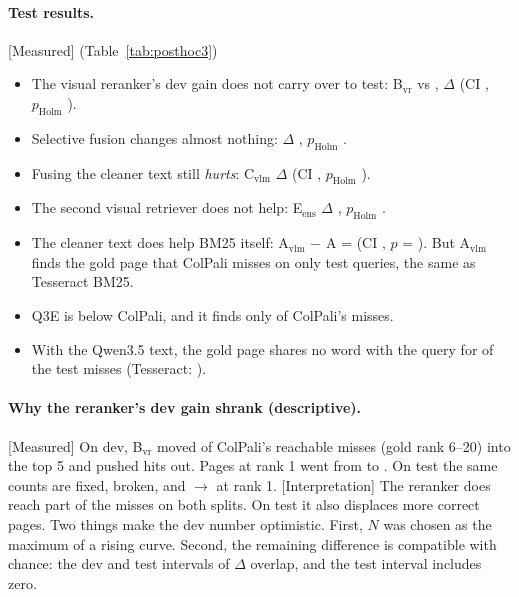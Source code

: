 \documentclass[11pt,a4paper]{article}
\newcommand{\lbl}[2]{\textsf{\scriptsize\textcolor{#1}{[#2]}}}
\newcommand{\Int}{\lbl{tagI}{Interpretation}}
\newcommand{\Mea}{\lbl{tagM}{Measured}}
\newcommand{\file}[1]{\texttt{\small\hyphenchar\font=`\/ #1}}
\begin{document}
\paragraph{Test results.} \Mea{} (Table~\ref{tab:posthoc3})
\begin{itemize}
  \item The visual reranker's dev gain does not carry over to test: B$_\text{vr}$ \testBvr{} vs \testB{}, $\Delta$ \deltaBvr{} (CI \deltaBvrCI{}, $p_\text{Holm}$ \pHolmBvr{}).
  \item Selective fusion changes almost nothing: $\Delta$ \deltaCsel{}, $p_\text{Holm}$ \pHolmCsel{}.
  \item Fusing the cleaner text still \emph{hurts}: C$_\text{vlm}$ $\Delta$ \deltaCvlm{} (CI \deltaCvlmCI{}, $p_\text{Holm}$ \pHolmCvlm{}).
  \item The second visual retriever does not help: E$_\text{ens}$ $\Delta$ \deltaEens{}, $p_\text{Holm}$ \pHolmEens{}.
  \item The cleaner text does help BM25 itself: A$_\text{vlm}$ $-$ A = \deltaAvlmA{} (CI \deltaAvlmACI{}, $p$ = \pAvlmA{}). But A$_\text{vlm}$ finds the gold page that ColPali misses on only \headOnlyAvlm{} test queries, the same as Tesseract BM25.
  \item Q3E is \deltaQthreeEB{} below ColPali, and it finds only \headOnlyQthreeE{} of ColPali's misses.
  \item With the Qwen3.5 text, the gold page shares no word with the query for \noOverlapMissVlmTest{} of the \missTest{} test misses (Tesseract: \noOverlapMissTest{}).
\end{itemize}

\begin{table}[!htbp]\centering\small

\caption{\Mea{} Post-hoc set 3: dev selection and the single test run (\file{results/posthoc3/}).}\label{tab:posthoc3}
\end{table}

\paragraph{Why the reranker's dev gain shrank (descriptive).} \Mea{} On dev, B$_\text{vr}$ moved \vrFixedDev{} of ColPali's \vrReachDev{} reachable misses (gold rank 6--20) into the top 5 and pushed \vrBrokenDev{} hits out. Pages at rank 1 went from \vrRankOneBDev{} to \vrRankOneDev{}. On test the same counts are \vrFixedTest{} fixed, \vrBrokenTest{} broken, and \vrRankOneBTest{} $\rightarrow$ \vrRankOneTest{} at rank 1.
\Int{} The reranker does reach part of the misses on both splits. On test it also displaces more correct pages. Two things make the dev number optimistic. First, $N$ was chosen as the maximum of a rising curve. Second, the remaining difference is compatible with chance: the dev and test intervals of $\Delta$ overlap, and the test interval includes zero.
\end{document}
